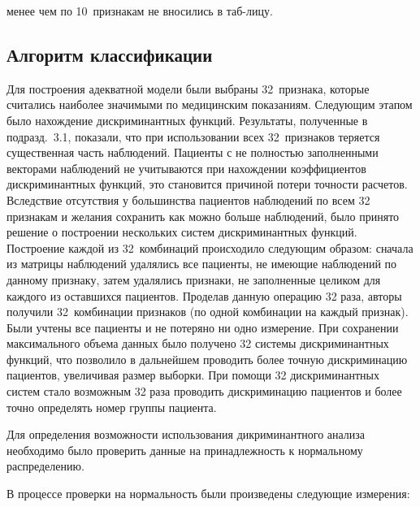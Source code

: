\begin{multicols}{2}


\addtocounter{figure}{1}   
 
 
 
\noindent
 менее чем по 10~признакам 
не вносились в таб-\linebreak лицу.
 

\subsection{Алгоритм классификации}

Для построения адекватной модели были выбраны 32~признака, которые
считались наиболее значимыми по медицинским показаниям. Следующим
этапом было нахождение дискриминантных функций. Результаты,
полученные в подразд.~3.1, показали, что при использовании всех 
32~признаков теряется существенная часть наблюдений. Пациенты с не
полностью заполненными векторами наблюдений не учитываются при
нахождении коэффициентов дискриминантных функций, это становится
причиной потери точности расчетов. Вследствие отсутствия у
большинства пациентов наблюдений по всем 32 признакам и желания
сохранить как можно больше наблюдений, было принято решение о
построении нескольких систем дискриминантных функций. Построение
каждой из 32~комбинаций происходило следующим образом: сначала из
матрицы наблюдений удалялись все пациенты, не имеющие наблюдений по
данному признаку, затем удалялись признаки, не заполненные целиком
для каждого из оставшихся пациентов. Проделав данную операцию 32
раза, авторы получили 32~комбинации признаков (по одной комбинации
на каждый признак). Были учтены все пациенты и не потеряно ни одно
измерение. При сохранении максимального объема данных было получено
32 системы дискриминантных функций, что позволило в дальнейшем
проводить более точную дискриминацию пациентов, увеличивая размер
выборки. При помощи 32 дискриминантных систем стало возможным 32
раза проводить дискриминацию пациентов и более точно определять
номер группы пациента.


Для определения возможности использования дикриминантного анализа
необходимо было проверить данные на принадлежность к нормальному
распределению.

В процессе проверки на нормальность были произведены следующие измерения:


\end{multicols}
